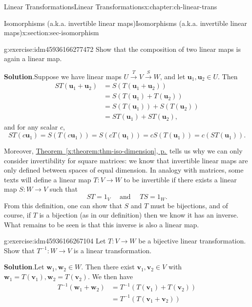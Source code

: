 \documentclass[oneside,10pt,]{book}
\newcommand{\blocktitlefont}{\relax}
\newcommand{\xreffont}{\relax}
\numberwithin{equation}{section}
\newcommand{\uu}{\mathbf{u}}
\newcommand{\vv}{\mathbf{v}}
\newcommand{\ww}{\mathbf{w}}
\newcommand{\amp}{&}
\begin{document}
\begin{chapterptx}{Linear Transformations}{}{Linear Transformations}{}{}{x:chapter:ch-linear-trans}
\begin{sectionptx}{Isomorphisms (a.k.a. invertible linear maps)}{}{Isomorphisms (a.k.a. invertible linear maps)}{}{}{x:section:sec-isomorphism}
\begin{inlineexercise}{}{g:exercise:idm45936166277472}
Show that the composition of two linear maps is again a linear map.%
\par\smallskip%
\noindent\textbf{\blocktitlefont Solution}.\label{g:solution:idm45936166271168}{}\hypertarget{g:solution:idm45936166271168}{}\quad{}Suppose we have linear maps \(U\xrightarrow{T} V\xrightarrow{S} W\), and let \(\uu_1,\uu_2\in U\). Then%
\begin{align*}
ST(\uu_1+\uu_2) \amp = S(T(\uu_1+\uu_2)) \\
\amp = S(T(\uu_1)+T(\uu_2))\\
\amp = S(T(\uu_1))+S(T(\uu_2)) \\
\amp = ST(\uu_1)+ST(\uu_2)\text{,}
\end{align*}
and for any scalar \(c\),%
\begin{equation*}
ST(c\uu_1) = S(T(c\uu_1))=S(cT(\uu_1)) = cS(T(\uu_1))=c(ST(\uu_1))\text{.}
\end{equation*}
%
\end{inlineexercise}%
Moreover, \hyperref[x:theorem:thm-iso-dimension]{Theorem~{\xreffont\ref{x:theorem:thm-iso-dimension}}, p.\,\pageref{x:theorem:thm-iso-dimension}} tells us why we can only consider invertibility for square matrices: we know that invertible linear maps are only defined between spaces of equal dimension. In analogy with matrices, some texts will define a linear map \(T:V\to W\) to be invertible if there exists a linear map \(S:W\to V\) such that%
\begin{equation*}
ST = 1_V \quad \text{ and } \quad TS = 1_W\text{.}
\end{equation*}
From this definition, one can show that \(S\) and \(T\) must be bijections, and of course, if \(T\) is a bijection (as in our definition) then we know it has an inverse. What remains to be seen is that this inverse is also a linear map.%
\begin{inlineexercise}{}{g:exercise:idm45936166267104}%
Let \(T:V\to W\) be a bijective linear transformation. Show that \(T^{-1}:W\to V\) is a linear transformation.%
\par\smallskip%
\noindent\textbf{\blocktitlefont Solution}.\label{g:solution:idm45936166261664}{}\hypertarget{g:solution:idm45936166261664}{}\quad{}Let \(\ww_1,\ww_2\in W\). Then there exist \(\vv_1,\vv_2\in V\)  with \(\ww_1=T(\vv_1), \ww_2=T(\vv_2)\). We then have%
\begin{align*}
T^{-1}(\ww_1+\ww_2) \amp = T^{-1}(T(\vv_1)+T(\vv_2)) \\
\amp = T^{-1}(T(\vv_1+\vv_2))\\

\end{align*}
\end{inlineexercise}
\end{sectionptx}
\end{chapterptx}
\end{document}
